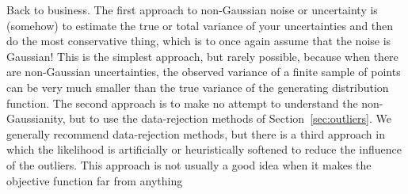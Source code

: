 \documentclass[12pt,twoside]{article}
\newcommand{\sectionname}{Section}
\begin{document}
Back to business.  The first approach to non-Gaussian noise or
uncertainty is (somehow) to estimate the true or total variance of
your uncertainties and then do the most conservative thing, which is
to once again assume that the noise is Gaussian!  This is the simplest
approach, but rarely possible, because when there are non-Gaussian
uncertainties, the observed variance of a finite sample of points can
be very much smaller than the true variance of the generating
distribution function.  The second approach is to make no attempt to
understand the non-Gaussianity, but to use the data-rejection methods
of \sectionname~\ref{sec:outliers}.  We generally recommend
data-rejection methods, but there is a third approach in which the
likelihood is artificially or heuristically softened to reduce the
influence of the outliers.  This approach is not usually a good idea
when it makes the objective function far from anything
\end{document}
